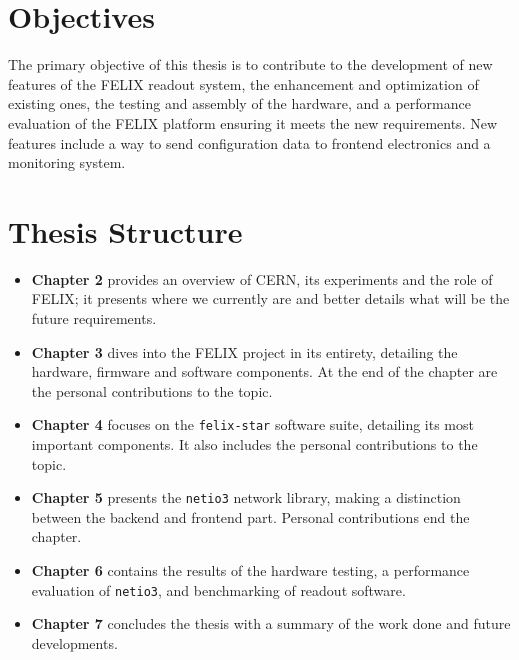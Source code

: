 \section{Objectives}

The primary objective of this thesis is to contribute to the development of new features of the \acs{FELIX} readout system, the enhancement and optimization of existing ones, the testing and assembly of the hardware, and a performance evaluation of the \acs{FELIX} platform ensuring it meets the new requirements.
New features include a way to send configuration data to frontend electronics and a monitoring system.

\section{Thesis Structure}

\begin{itemize}
    \item \textbf{Chapter 2} provides an overview of \acs{CERN}, its experiments and the role of \acs{FELIX}; it presents where we currently are and better details what will be the future requirements.
    
    \item \textbf{Chapter 3} dives into the \acs{FELIX} project in its entirety, detailing the hardware, firmware and software components. At the end of the chapter are the personal contributions to the topic.
    
    \item \textbf{Chapter 4} focuses on the \texttt{felix-star} software suite, detailing its most important components. It also includes the personal contributions to the topic.
    
    \item \textbf{Chapter 5} presents the \texttt{netio3} network library, making a distinction between the backend and frontend part. Personal contributions end the chapter.
    
    \item \textbf{Chapter 6} contains the results of the hardware testing, a performance evaluation of \texttt{netio3}, and benchmarking of readout software.
    
    \item \textbf{Chapter 7} concludes the thesis with a summary of the work done and future developments.
\end{itemize}